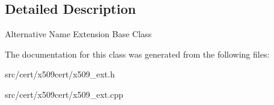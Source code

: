 \subsection{Detailed Description}
Alternative Name Extension Base Class 

The documentation for this class was generated from the following files\-:\begin{DoxyCompactItemize}
\item 
src/cert/x509cert/x509\-\_\-ext.\-h\item 
src/cert/x509cert/x509\-\_\-ext.\-cpp\end{DoxyCompactItemize}
